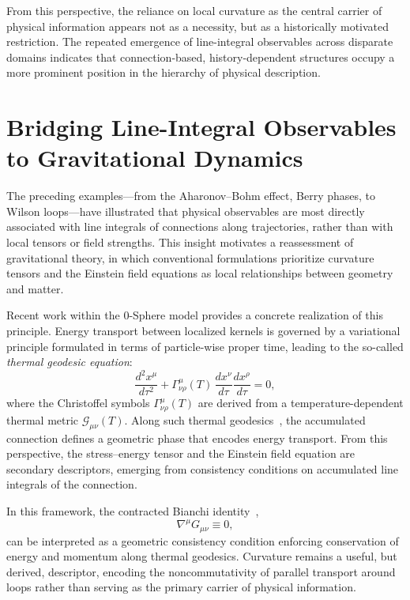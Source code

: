 \documentclass[%
 reprint,
 amsmath,amssymb,
 aps,
 prb,
]{revtex4-2}
\numberwithin{equation}{section}
\begin{document}
From this perspective, the reliance on local curvature as the central carrier of physical information appears not as a necessity, but as a historically motivated restriction. The repeated emergence of line-integral observables across disparate domains indicates that connection-based, history-dependent structures occupy a more prominent position in the hierarchy of physical description.


\section{Bridging Line-Integral Observables to Gravitational Dynamics}
\label{sec:bridge_gravity}

The preceding examples—from the Aharonov--Bohm effect, Berry phases, to Wilson loops—have illustrated that physical observables are most directly associated with line integrals of connections along trajectories, rather than with local tensors or field strengths. This insight motivates a reassessment of gravitational theory, in which conventional formulations prioritize curvature tensors and the Einstein field equations as local relationships between geometry and matter.


Recent work within the 0-Sphere model \cite{hanamura17765017,hanamura18064535,hanamura17765409} provides a concrete realization of this principle. Energy transport between localized kernels is governed by a variational principle formulated in terms of particle-wise proper time, leading to the so-called \emph{thermal geodesic equation}:
\begin{equation} \label{eq:thermal_geodesic}
\frac{d^2 x^\mu}{d\tau^2} + \Gamma^\mu_{\nu\rho}(T) \, \frac{dx^\nu}{d\tau} \frac{dx^\rho}{d\tau} = 0,
\end{equation}
where the Christoffel symbols $\Gamma^\mu_{\nu\rho}(T)$ are derived from a temperature-dependent thermal metric $\mathcal{G}_{\mu\nu}(T)$. Along such thermal geodesics~\cite{hanamura17765017}, the accumulated connection defines a geometric phase that encodes energy transport. From this perspective, the stress--energy tensor and the Einstein field equation are secondary descriptors, emerging from consistency conditions on accumulated line integrals of the connection.

In this framework, the contracted Bianchi identity~\cite{Wald},
\begin{equation}
\nabla^\mu G_{\mu\nu} \equiv 0,
\end{equation}
can be interpreted as a geometric consistency condition enforcing conservation of energy and momentum along thermal geodesics. Curvature remains a useful, but derived, descriptor, encoding the noncommutativity of parallel transport around loops rather than serving as the primary carrier of physical information.
\end{document}
